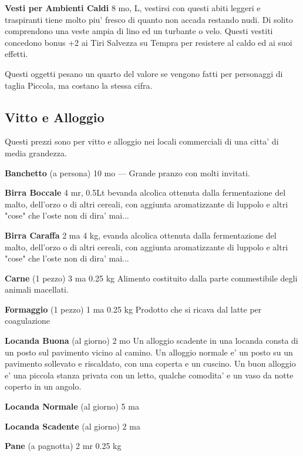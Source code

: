 \documentclass[a4paper,11pt,twoside,openany]{book}
\begin{document}
{		\textbf{Vesti per Ambienti Caldi} 8 mo, L, vestirsi con questi abiti leggeri e traspiranti tiene molto piu' fresco di quanto non accada restando nudi. Di solito comprendono una veste ampia di lino ed un turbante o velo. Questi vestiti concedono bonus +2 ai Tiri Salvezza su Tempra per resistere al caldo ed ai suoi effetti. 
		
		Questi oggetti pesano un quarto del valore se vengono fatti per personaggi di taglia Piccola, ma costano la stessa cifra.
		
		\pagebreak
		
		\subsection{Vitto e Alloggio}
		
		\label{vitto-e-alloggio}
		
		Questi prezzi sono per vitto e alloggio nei locali commerciali di una citta' di media grandezza.
		
		\textbf{Banchetto} (a persona) 10 mo --- Grande pranzo con molti invitati.
		
		\textbf{Birra Boccale} 4 mr, 0.5Lt bevanda alcolica ottenuta dalla fermentazione del malto, dell'orzo o di altri cereali, con aggiunta aromatizzante di luppolo e altri "cose" che l'oste non di dira' mai...
		
		\textbf{Birra Caraffa} 2 ma 4 kg, evanda alcolica ottenuta dalla fermentazione del malto, dell'orzo o di altri cereali, con aggiunta aromatizzante di luppolo e altri "cose" che l'oste non di dira' mai...
		
		\textbf{Carne} (1 pezzo) 3 ma 0.25 kg Alimento costituito dalla parte commestibile degli animali macellati.
		
		\textbf{Formaggio} (1 pezzo) 1 ma 0.25 kg Prodotto che si ricava dal latte per coagulazione
		
		\textbf{Locanda Buona} (al giorno) 2 mo Un alloggio scadente in una locanda consta di un posto sul pavimento vicino al camino. Un alloggio normale e' un posto su un pavimento sollevato e riscaldato, con una coperta e un cuscino. Un buon alloggio e' una piccola stanza privata con un letto, qualche comodita' e un vaso da notte coperto in un angolo.
		
		\textbf{Locanda Normale} (al giorno) 5 ma
		
		\textbf{Locanda Scadente} (al giorno) 2 ma 
		
		\textbf{Pane} (a pagnotta) 2 mr 0.25 kg
		
}
\end{document}
